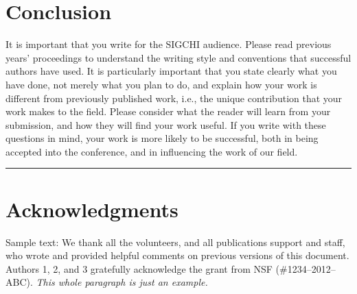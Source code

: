 \documentclass{ciis}
\begin{document}
\section{Conclusion}

It is important that you write for the SIGCHI audience. Please read
previous years' proceedings to understand the writing style and
conventions that successful authors have used. It is particularly
important that you state clearly what you have done, not merely what
you plan to do, and explain how your work is different from previously
published work, i.e., the unique contribution that your work makes to
the field. Please consider what the reader will learn from your
submission, and how they will find your work useful. If you write with
these questions in mind, your work is more likely to be successful,
both in being accepted into the conference, and in influencing the
work of our field.

\noindent\rule{8cm}{0.4pt}

\section{Acknowledgments}

Sample text: We thank all the volunteers, and all publications support
and staff, who wrote and provided helpful comments on previous
versions of this document. Authors 1, 2, and 3 gratefully acknowledge
the grant from NSF (\#1234--2012--ABC). \textit{This whole paragraph is
  just an example.}

%
%
%
%
%
\balance{}
\end{document}

